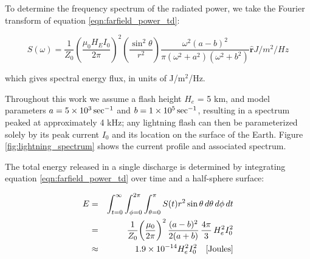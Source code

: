 To determine the frequency spectrum of the radiated power, we take the Fourier transform of equation \ref{eqn:farfield_power_td}:

\begin{equation}
\label{eqn:farfield_power_fd}
S(\omega) = \frac{1}{Z_0}\left(\frac{\mu_0 H_E I_0}{2 \pi}\right)^2\left(\frac{\sin^2\theta}{r^2}\right) \frac{\omega^2(a-b)^2}{\pi(\omega^2 + a^2)(\omega^2 + b^2)}  \mathbf{\hat{r}}
\unit{J/m^2/Hz}
\end{equation}

which gives spectral energy flux, in units of J/m$^2$/Hz.

Throughout this work we assume a flash height $H_e$ = 5 km, and model parameters $a=5\times 10^{3}\,\mathrm{sec}^{-1}$ and $b=1\times 10^{5}\,\mathrm{sec}^{-1}$, resulting in a spectrum peaked at approximately 4 kHz; any lightning flash can then be parameterized solely by its peak current $I_0$ and its location on the surface of the Earth. Figure \ref{fig:lightning_spectrum} shows the current profile and associated spectrum.

The total energy released in a single discharge is determined by integrating equation \ref{eqn:farfield_power_td} over time and a half-sphere surface:

\begin{eqnarray}
\label{eqn:total_energy_below_iono}
E &= &\int_{t=0}^\infty \int_{\phi=0}^{2\pi} \int_{\theta=0}^\pi  S(t) r^2 \sin\theta\,d\theta\,d\phi\,dt \\
 & = & \frac{1}{Z_0}\bigg(\frac{\mu_0}{2\pi}\bigg)^2 \, \frac{(a - b)^2}{2 (a + b)}  \, \frac{4 \pi}{3} \, H_e^2 I_0^2 \\
 & \approx & 1.9\times 10^{-14}H_e^2 I_0^2 \quad[\mathrm{Joules}]
\end{eqnarray}


